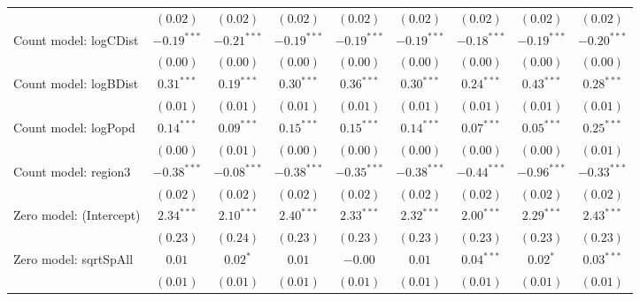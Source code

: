 \begin{sidewaystable}
\begin{center}
{\begin{tabular}{l c c c c c c c c}
                               & $(0.02)$      & $(0.02)$      & $(0.02)$      & $(0.02)$        & $(0.02)$      & $(0.02)$      & $(0.02)$       & $(0.02)$      \\
Count model: logCDist          & $-0.19^{***}$ & $-0.21^{***}$ & $-0.19^{***}$ & $-0.19^{***}$   & $-0.19^{***}$ & $-0.18^{***}$ & $-0.19^{***}$  & $-0.20^{***}$ \\
                               & $(0.00)$      & $(0.00)$      & $(0.00)$      & $(0.00)$        & $(0.00)$      & $(0.00)$      & $(0.00)$       & $(0.00)$      \\
Count model: logBDist          & $0.31^{***}$  & $0.19^{***}$  & $0.30^{***}$  & $0.36^{***}$    & $0.30^{***}$  & $0.24^{***}$  & $0.43^{***}$   & $0.28^{***}$  \\
                               & $(0.01)$      & $(0.01)$      & $(0.01)$      & $(0.01)$        & $(0.01)$      & $(0.01)$      & $(0.01)$       & $(0.01)$      \\
Count model: logPopd           & $0.14^{***}$  & $0.09^{***}$  & $0.15^{***}$  & $0.15^{***}$    & $0.14^{***}$  & $0.07^{***}$  & $0.05^{***}$   & $0.25^{***}$  \\
                               & $(0.00)$      & $(0.01)$      & $(0.00)$      & $(0.00)$        & $(0.00)$      & $(0.00)$      & $(0.00)$       & $(0.01)$      \\
Count model: region3           & $-0.38^{***}$ & $-0.08^{***}$ & $-0.38^{***}$ & $-0.35^{***}$   & $-0.38^{***}$ & $-0.44^{***}$ & $-0.96^{***}$  & $-0.33^{***}$ \\
                               & $(0.02)$      & $(0.02)$      & $(0.02)$      & $(0.02)$        & $(0.02)$      & $(0.02)$      & $(0.02)$       & $(0.02)$      \\
Zero model: (Intercept)        & $2.34^{***}$  & $2.10^{***}$  & $2.40^{***}$  & $2.33^{***}$    & $2.32^{***}$  & $2.00^{***}$  & $2.29^{***}$   & $2.43^{***}$  \\
                               & $(0.23)$      & $(0.24)$      & $(0.23)$      & $(0.23)$        & $(0.23)$      & $(0.23)$      & $(0.23)$       & $(0.23)$      \\
Zero model: sqrtSpAll          & $0.01$        & $0.02^{*}$    & $0.01$        & $-0.00$         & $0.01$        & $0.04^{***}$  & $0.02^{*}$     & $0.03^{***}$  \\
                               & $(0.01)$      & $(0.01)$      & $(0.01)$      & $(0.01)$        & $(0.01)$      & $(0.01)$      & $(0.01)$       & $(0.01)$      \\

\end{tabular}}
\end{center}
\end{sidewaystable}
